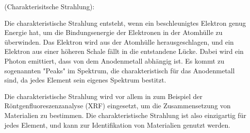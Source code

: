 \documentclass{tuftebook}
\begin{document}
        \begin{typ}
            \vspace{-1em}
            (Charakterisitsche Strahlung):
            \vspace{\baselineskip}

            \noindent Die charakteristische Strahlung entsteht, wenn ein beschleunigtes Elektron genug Energie hat, um die Bindungsenergie der Elektronen in der Atomhülle zu überwinden. Das Elektron wird aus der Atomhülle herausgeschlagen, und ein Elektron aus einer höheren Schale fällt in die entstandene Lücke. Dabei wird ein Photon emittiert, dass von dem Anodenmetall abhängig ist. Es kommt zu sogenannten "Peaks" im Spektrum, die charakteristisch für das Anodenmetall sind, da jedes Element sein eigenes Spektrum bestitzt.
        \end{typ}
        Die charakteristische Strahlung wird vor allem in zum Beispiel der Röntgenfluoreszenzanalyse (XRF) eingesetzt, um die Zusammensetzung von Materialien zu bestimmen. Die charakteristische Strahlung ist also einzigartig für jedes Element, und kann zur Identifikation von Materialien genutzt werden.
        
\end{document}
